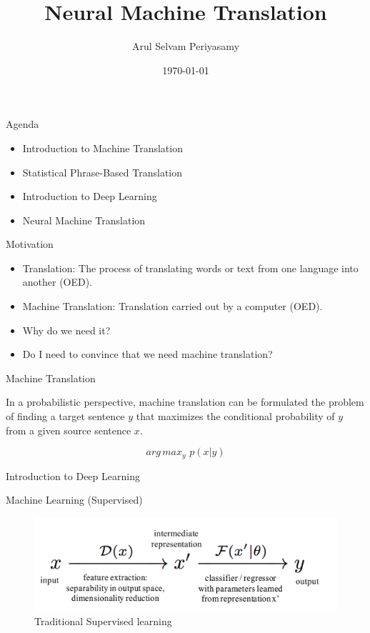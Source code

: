 ﻿\documentclass[aspectratio=43,mathserif,xcolor={usenames,dvipsnames,svgnames,table},10pt]{beamer}
\title[NMT]{Neural Machine Translation}
\author[Arul Selvam Periyasamy]{Arul Selvam Periyasamy}
\institute[University of Bonn]{Rheinische Friedrich-Wilhelms-Universit\"at Bonn\\
Seminar: Natural Language Processing}
\date{\today}
\begin{document}
\maketitle


\begin{frame}{Agenda}
 \begin{itemize}
  \item<+-> Introduction to Machine Translation
  \item<+-> Statistical Phrase-Based Translation
  \item<+-> Introduction to Deep Learning
  \item<+-> Neural Machine Translation

 \end{itemize}
\end{frame}

\begin{frame}{Motivation}
\begin{itemize}
 \item<+-> Translation: The process of translating words or text from one language into another (OED).
 \item<+-> Machine Translation: Translation carried out by a computer (OED).
 \item<+-> Why do we need it?
 \item<+-> Do I need to convince that we need machine translation?
\end{itemize}
\end{frame}


\begin{frame}{Machine Translation}

In a probabilistic perspective, machine translation can be formulated the problem of finding a target sentence $y$ that maximizes the conditional probability of $y$ from a given source sentence $x$.

$$ arg\,max _{y}  \,\, p(x|y)$$
\end{frame}


\begin{section}{Introduction to Deep Learning}
\end{section}

\begin{frame}{Machine Learning (Supervised)}
 \begin{figure}[h]
    \includegraphics[width=0.9\linewidth]{images/ml.png}  
    \caption{Traditional Supervised learning}
  \end{figure}
\end{frame}
\end{document}
